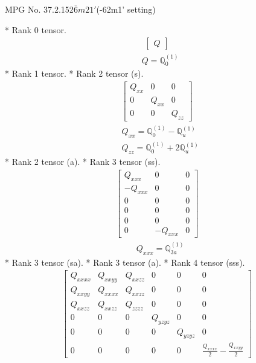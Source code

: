 \documentclass[fleqn,8pt,landscape]{jsarticle}
\begin{document}
\setcounter{MaxMatrixCols}{32}

\renewcommand{\tablename}{Table~}
\renewcommand{\figurename}{Figure~}
\begin{center}
\LARGE
MPG No. 37.2.152\quad$\bar{6}m21'$\quad(-62m1' setting)
\end{center}
* Rank 0 tensor.
\begin{align*}
\begin{bmatrix} Q \end{bmatrix}
\end{align*}
\begin{align*}
& Q = \mathbb{Q}_{0}^{(1)}
\end{align*}
* Rank 1 tensor.
* Rank 2 tensor (s).
\begin{align*}
\begin{bmatrix} Q_{xx} & 0 & 0 \\ 0 & Q_{xx} & 0 \\ 0 & 0 & Q_{zz} \end{bmatrix}
\end{align*}
\begin{align*}
& Q_{xx} = \mathbb{Q}_{0}^{(1)} - \mathbb{Q}_{u}^{(1)} \\
& Q_{zz} = \mathbb{Q}_{0}^{(1)} + 2 \mathbb{Q}_{u}^{(1)}
\end{align*}
* Rank 2 tensor (a).
* Rank 3 tensor (ss).
\begin{align*}
\begin{bmatrix} Q_{xxx} & 0 & 0 \\ - Q_{xxx} & 0 & 0 \\ 0 & 0 & 0 \\ 0 & 0 & 0 \\ 0 & 0 & 0 \\ 0 & - Q_{xxx} & 0 \end{bmatrix}
\end{align*}
\begin{align*}
& Q_{xxx} = \mathbb{Q}_{3a}^{(1)}
\end{align*}
* Rank 3 tensor (sa).
* Rank 3 tensor (a).
* Rank 4 tensor (sss).
\begin{align*}
\begin{bmatrix} Q_{xxxx} & Q_{xxyy} & Q_{xxzz} & 0 & 0 & 0 \\ Q_{xxyy} & Q_{xxxx} & Q_{xxzz} & 0 & 0 & 0 \\ Q_{xxzz} & Q_{xxzz} & Q_{zzzz} & 0 & 0 & 0 \\ 0 & 0 & 0 & Q_{yzyz} & 0 & 0 \\ 0 & 0 & 0 & 0 & Q_{yzyz} & 0 \\ 0 & 0 & 0 & 0 & 0 & \frac{Q_{xxxx}}{2} - \frac{Q_{xxyy}}{2} \end{bmatrix}
\end{align*}
\end{document}
